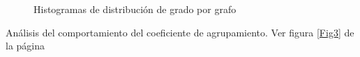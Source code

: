\documentclass{article}
\begin{document}
\begin{figure}[htbp]
\caption{Histogramas de distribución de grado por grafo}
\label{Fig2} 
\end{figure}

Análisis del comportamiento del coeficiente de agrupamiento. Ver figura \ref{Fig3} de la página \pageref{Fig3} 
\end{document}
